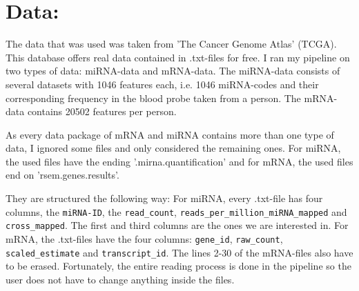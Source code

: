 \documentclass{bioinfo}
\begin{document}
 

\section{Data:}
 

The data that was used was taken from 'The Cancer Genome Atlas' (TCGA). This database offers real data contained in .txt-files for free. I ran my pipeline on two types of data: miRNA-data and mRNA-data. The miRNA-data consists of several datasets with 1046 features each, i.e. 1046 miRNA-codes and their corresponding frequency in the blood probe taken from a person. The mRNA-data contains 20502 features per person. 

As every data package of mRNA and miRNA contains more than one type of data, I ignored some files and only considered the remaining ones. For miRNA, the used files have the ending '.mirna.quantification' and for mRNA, the used files end on 'rsem.genes.results'. 

They are structured the following way: For miRNA, every .txt-file has four columns, the \texttt{miRNA-ID}, the \texttt{read\_count}, \texttt{reads\_per\_million\_miRNA\_mapped}
 and \texttt{cross\_mapped}. The first and third columns 
are the ones we are interested in. For mRNA, the 
.txt-files have the four columns: \texttt{gene\_id}, 
\texttt{raw\_count}, \texttt{scaled\_estimate} and 
\texttt{transcript\_id}. The lines 2-30 of the mRNA-files 
also have to be erased. Fortunately, the entire reading process is done in the pipeline so the user does not have to change anything inside the files. 
\end{document}
